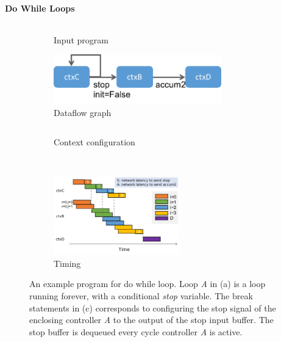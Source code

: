 \paragraph{Do While Loops}

\begin{figure}
\centering
  \vspace{-1cm}
\begin{subfigure}[b]{0.45\textwidth}
\inputminted{python}{code/dowhile.py}
\caption{Input program}
  \vspace{0.2cm}
\includegraphics[width=0.8\textwidth]{figs/dowhile.pdf}
\caption{Dataflow graph}
\end{subfigure}
\hfill
\begin{subfigure}[b]{0.48\textwidth}
\inputminted{python}{code/dowhilectx.py}
\caption{Context configuration}
\end{subfigure}
\\
  \vspace{0.2cm}
\begin{subfigure}[b]{\textwidth}
  \centering
\includegraphics[width=0.6\textwidth]{figs/dowhiletiming.pdf}
\caption{Timing}
\end{subfigure}
\caption[Do while example]{
  An example program for do while loop. 
  Loop \emph{A} in (a) is a loop running forever, with a conditional \emph{stop} variable.
  The break statements in (c) corresponds to configuring the stop signal of the enclosing controller \emph{A}
  to the output of the stop input buffer. The stop buffer is dequeued every cycle controller \emph{A} is active.
}
\label{fig:dowhile} 
\end{figure}

